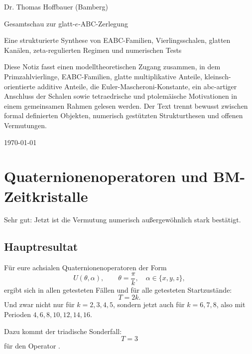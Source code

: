 \documentclass[11pt,a4paper]{article}
\theoremstyle{definition}
\begin{document}
	
	\begin{titlepage}
		\centering
		{\Large Dr. Thomas Hoffbauer (Bamberg)\par}
		\vspace{2cm}
		{\huge\bfseries \raggedright Gesamtschau zur glatt-$e$-ABC-Zerlegung\par}
		\vspace{0.6cm}
		{\Large\raggedright Eine strukturierte Synthese von EABC-Familien, Vierlingsschalen, glatten Kanälen, zeta-regulierten Regimen und numerischen Tests\par}
		\vspace{1.5cm}
		\begin{minipage}{0.88\textwidth}
			\small\raggedright
			Diese Notiz fasst einen modelltheoretischen Zugang zusammen, in dem Primzahlvierlinge, EABC-Familien, glatte multiplikative Anteile, kleinsch-orientierte additive Anteile, die Euler-Mascheroni-Konstante, ein abc-artiger Anschluss der Schalen sowie tetraedrische und ptolemäische Motivationen in einem gemeinsamen Rahmen gelesen werden. Der Text trennt bewusst zwischen formal definierten Objekten, numerisch gestützten Strukturthesen und offenen Vermutungen.
		\end{minipage}
		\vfill
		{\large \today\par}
	\end{titlepage}
	
	\tableofcontents
	\newpage
	
	
	\section{Quaternionenoperatoren und BM-Zeitkristalle}
	
	Sehr gut: Jetzt ist die Vermutung numerisch außergewöhnlich stark bestätigt.
	
	\subsection*{Hauptresultat}
	
	Für eure achsialen Quaternionenoperatoren der Form
	\[
	U(\theta,\alpha), \qquad \theta=\frac{\pi}{k},\quad \alpha\in\{x,y,z\},
	\]
	ergibt sich in allen getesteten Fällen und für alle getesteten Startzustände:
	\[
	T = 2k.
	\]
	Und zwar nicht nur für $k=2,3,4,5$, sondern jetzt auch für $k=6,7,8$, also mit Perioden $4,6,8,10,12,14,16$.
	
	Dazu kommt der triadische Sonderfall:
	\[
	T=3
	\]
	für den Operator \texttt{}.
	
\end{document}
